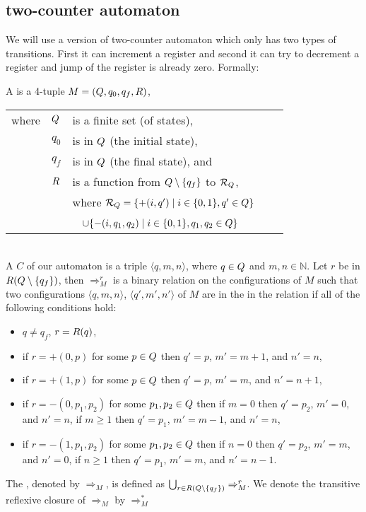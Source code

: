 \subsection{two-counter automaton} %
We will use a version of two-counter automaton which only has two types of transitions. First it can increment a register and second it can try to decrement a register and jump of the register is already zero. Formally:
\begin{definition}
	A  is a 4-tuple $M=(Q,q_0,q_f,R)$,
	\begin{tabular}{llp{0.78\linewidth}}
		where & $Q$ & is a finite set (of states),                                                                           \\
& $q_0$        & is in $Q$ (the initial state),                                                                \\
& $q_f$        & is in $Q$ (the final state), and                                                              \\
& $R$  & is a function from $Q\setminus\{q_f\}$ to $\mathcal{R}_\autStates$,                           \\
&              & where $\mathcal{R}_{Q}=\{+(i,q')\mid i\in\{0,1\},q'\in Q\}$                             \\
&              & ~ \hphantom{where $\mathcal{R}_\autStates$}$\cup\{-(i,q_1,q_2)\mid i\in\{0,1\},q_1,q_2\in Q\}$ 
	\end{tabular}\\
	A  $C$ of our automaton is a triple $\langle q,m,n\rangle$, where $q\in Q$ and $m,n\in\mathbb{N}$.
	Let $r$ be in $R(Q\setminus\{q_f\})$, then $\Rightarrow^r_M$ is a binary relation on the configurations of $M$ such that two configurations $\langle q,m,n\rangle$, $\langle q',m',n'\rangle$ of $M$ are in the in the relation if all of the following conditions hold:
	\begin{itemize}
		\item $q\neq q_f$, $r=R(q)$,
		\item if $r=+(0,p)$ for some $p\in Q$ then $q'=p$, $m'=m+1$, and $n'=n$,
		\item if $r=+(1,p)$ for some $p\in Q$ then $q'=p$, $m'=m$, and $n'=n+1$,
		\item if $r=-(0,p_1,p_2)$ for some $p_1,p_2\in Q$ then
\subitem if $m=0$ then $q'=p_2$, $m'=0$, and $n'=n$,
\subitem if $m\geq1$ then $q'=p_1$, $m'=m-1$, and $n'=n$,
		\item if $r=-(1,p_1,p_2)$ for some $p_1,p_2\in Q$ then
\subitem if $n=0$ then $q'=p_2$, $m'=m$, and $n'=0$,
\subitem if $n\geq1$ then $q'=p_1$, $m'=m$, and $n'=n-1$.
	\end{itemize}
	The , denoted by $\Rightarrow_M$, is defined as $\bigcup_{r\in R(Q\setminus\{q_f\})}\Rightarrow^r_M$. We denote the transitive reflexive closure of $\Rightarrow_M$ by $\Rightarrow^*_M$
		

\end{definition}
